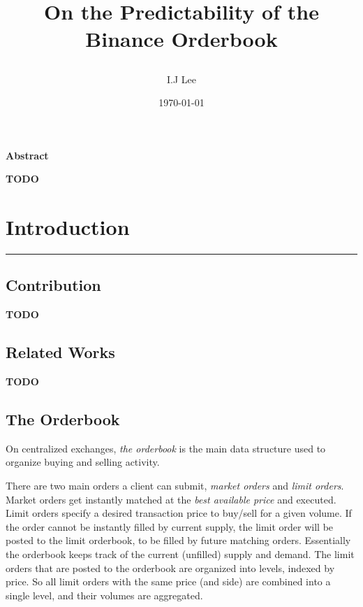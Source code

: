 \documentclass[a4paper, oneside, notitlepage]{book}
\title{
On the Predictability of the Binance Orderbook 
\author{I.J Lee}
\date{\today}
}
\begin{document}
\maketitle

\begin{center}
   \textbf{Abstract} 
\end{center}
\textbf{TODO}

\clearpage
\tableofcontents

\chapter{Introduction}
\hrule
\vspace{40pt}

\section{Contribution}
\textbf{TODO}

\section{Related Works}
\textbf{TODO}

\section{The Orderbook}
On centralized exchanges, \textit{the orderbook} is the main data structure used to
organize buying and selling activity. 

There are two main orders a client can submit, \textit{market orders} and \textit{limit orders}.
Market orders get instantly matched at the \textit{best available price}
and executed. Limit orders specify a desired transaction price to buy/sell for a given volume.
If the order cannot be instantly filled by current supply, the limit order will
be posted to the limit orderbook, to be filled by future matching orders.
Essentially the orderbook keeps track of the current (unfilled) supply and demand.
The limit orders that are posted to the orderbook are organized into levels,
indexed by price. So all limit orders with the same price (and side) are 
combined into a single level, and their volumes are aggregated.
\end{document}
